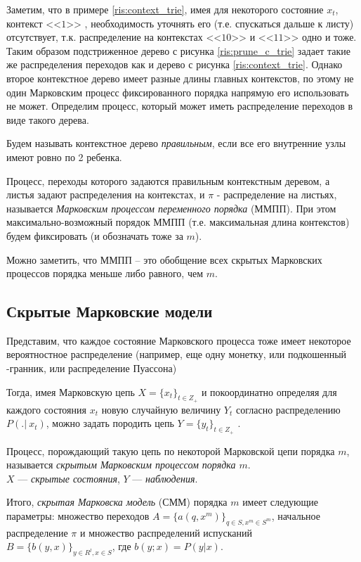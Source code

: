 \documentclass{matmex-diploma-custom}
\begin{document}
Заметим, что в примере \ref{ris:context_trie}, имея для некоторого состояние $x_{t}$, контекст  <<$1$>> , необходимость уточнять его (т.е. спускаться дальше к листу) отсутствует, т.к. распределение на контекстах  <<$10$>>  и  <<$11$>>  одно и тоже. 
Таким образом подстриженное дерево с рисунка \ref{ris:prune_c_trie} задает такие же распределения переходов как и дерево с рисунка \ref{ris:context_trie}. 
Однако второе контекстное дерево имеет разные длины главных контекстов, по этому не один Марковским процесс фиксированного порядка напрямую его использовать не может.
Определим процесс, который может иметь распределение переходов в виде такого дерева.

Будем называть контекстное дерево \textit{правильным}, если все его внутренние узлы имеют ровно по 2 ребенка.

Процесс, переходы которого задаются правильным контекстным деревом, а листья задают распределения на контекстах, и $\pi$ - распределение на листьях,  называется \textit{Марковским процессом переменного порядка} (ММПП).
При этом максимально-возможный порядок ММПП (т.е. максимальная длина контекстов) будем фиксировать (и обозначать тоже за $ m $).

Можно заметить, что ММПП -- это обобщение всех скрытых Марковских процессов порядка меньше либо равного, чем $ m $.

\subsection{Скрытые Марковские модели}
Представим, что каждое состояние Марковского процесса тоже имеет некоторое вероятностное распределение (например, еще одну монетку, или подкошенный \infty-гранник, или распределение Пуассона)

Тогда, имея Марковскую цепь $X = \{x_{t}\}_{t \in Z_{+}}$ и покоординатно определяя для каждого состояния $x_{t}$ новую случайную величину $Y_{t}$ согласно распределению $P(.|~x_{t})$, можно задать породить цепь
$Y = \{y_{t}\}_{t \in Z_{+}}$ .

Процесс, порождающий такую цепь по некоторой Марковской цепи порядка $m$, называется \textit{скрытым Марковским процессом порядка $m$}. 
\\
$ X $ --- \textit{скрытые состояния}, $Y$ --- \textit{наблюдения}.

Итого, \textit{скрытая Марковска модель} (СММ) порядка $ m $ имеет следующие параметры: множество переходов $ A = \{a(q, x^{m})\}_{q \in S, x^{m} \in S^{m}}$, начальное распределение $\pi$ и множество распределений испусканий $ B = \{b(y,x)\}_{y \in R^{l}, x \in S}$, где $ b(y; x) = P(y|x)$. 
\end{document}
